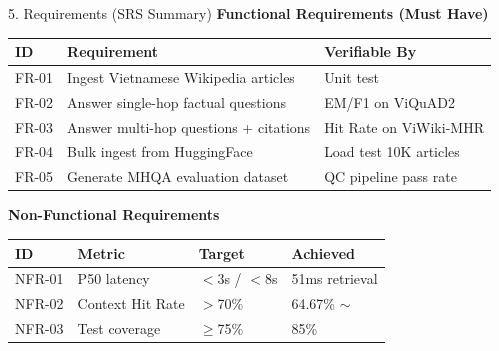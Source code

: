 \documentclass[aspectratio=169]{beamer}
\newcommand{\pos}[1]{\textcolor{positive}{#1}}
\newcommand{\con}[1]{\textcolor{negative}{#1}}
\begin{document}
\begin{frame}[shrink=8]{5. Requirements (SRS Summary)}
\textbf{Functional Requirements (Must Have)}
\vspace{2pt}
\begin{center}
\footnotesize
\begin{tabular}{l>{\raggedright\arraybackslash}p{4.5cm}l}
\toprule
\textbf{ID} & \textbf{Requirement} & \textbf{Verifiable By} \\
\midrule
FR-01 & Ingest Vietnamese Wikipedia articles & Unit test \\
FR-02 & Answer single-hop factual questions & EM/F1 on ViQuAD2 \\
FR-03 & Answer multi-hop questions + citations & Hit Rate on ViWiki-MHR \\
FR-04 & Bulk ingest from HuggingFace & Load test 10K articles \\
FR-05 & Generate MHQA evaluation dataset & QC pipeline pass rate \\
\bottomrule
\end{tabular}
\end{center}
\vspace{1pt}
\textbf{Non-Functional Requirements}
\vspace{2pt}
\begin{center}
\footnotesize
\begin{tabular}{llll}
\toprule
\textbf{ID} & \textbf{Metric} & \textbf{Target} & \textbf{Achieved} \\
\midrule
NFR-01 & P50 latency & $<$3s / $<$8s & 51ms retrieval \pos{\checkmark} \\
NFR-02 & Context Hit Rate & $>$70\% & 64.67\% \con{$\sim$} \\
NFR-03 & Test coverage & $\geq$75\% & 85\% \pos{\checkmark} \\
\bottomrule
\end{tabular}
\end{center}
\end{frame}
\end{document}
